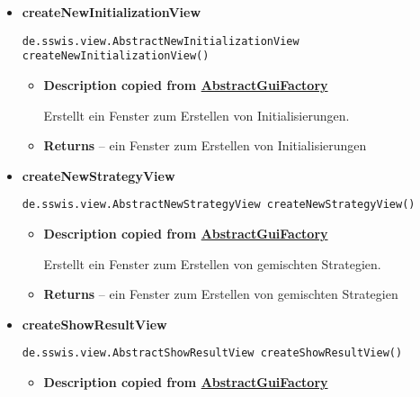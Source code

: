 {{{{{{{{{{\begin{itemize}
{\begin{itemize}
{Erstellt ein Fenster zum Erstellen von Spielen.
}
\item{{\bf  Returns} -- 
ein Fenster zum Erstellen von Spielen 
}%
\end{itemize}
}%
\item{ 
\hypertarget{de.sswis.controller.SwingGuiFactory.createNewInitializationView()}{{\bf  createNewInitializationView}\\}
\begin{lstlisting}[frame=none]
de.sswis.view.AbstractNewInitializationView createNewInitializationView()\end{lstlisting} %
\begin{itemize}
\item{
{\bf  Description copied from \hyperlink{de.sswis.controller.AbstractGuiFactory}{AbstractGuiFactory}{\small {}} }

Erstellt ein Fenster zum Erstellen von Initialisierungen.
}
\item{{\bf  Returns} -- 
ein Fenster zum Erstellen von Initialisierungen 
}%
\end{itemize}
}%
\item{ 
\hypertarget{de.sswis.controller.SwingGuiFactory.createNewStrategyView()}{{\bf  createNewStrategyView}\\}
\begin{lstlisting}[frame=none]
de.sswis.view.AbstractNewStrategyView createNewStrategyView()\end{lstlisting} %
\begin{itemize}
\item{
{\bf  Description copied from \hyperlink{de.sswis.controller.AbstractGuiFactory}{AbstractGuiFactory}{\small {}} }

Erstellt ein Fenster zum Erstellen von gemischten Strategien.
}
\item{{\bf  Returns} -- 
ein Fenster zum Erstellen von gemischten Strategien 
}%
\end{itemize}
}%
\item{ 
\hypertarget{de.sswis.controller.SwingGuiFactory.createShowResultView()}{{\bf  createShowResultView}\\}
\begin{lstlisting}[frame=none]
de.sswis.view.AbstractShowResultView createShowResultView()\end{lstlisting} %
\begin{itemize}
\item{
{\bf  Description copied from \hyperlink{de.sswis.controller.AbstractGuiFactory}{AbstractGuiFactory}{\small {}} }

}
\end{itemize}}
\end{itemize}}}}}}}}}}}
